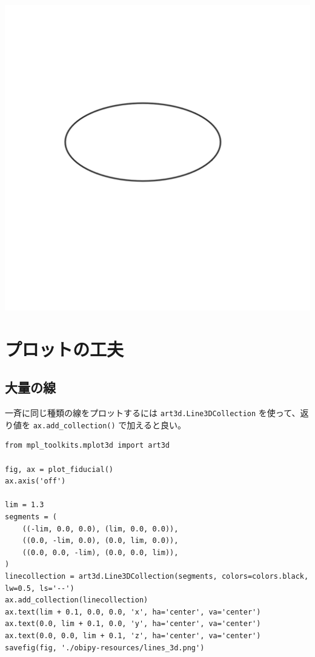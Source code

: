 \documentclass[a4paper, 10pt, notitlepage, twocolumn, uplatex, oneside, dvipdfmx]{jsarticle}
\begin{document}
\label{}
\begin{center}
\includegraphics[width=1.0\linewidth]{./obipy-resources/noaxis_3d.png}
\end{center}
\section{プロットの工夫}
\label{sec:org20c7485}
\subsection{大量の線}
\label{sec:orga1d43cb}
一斉に同じ種類の線をプロットするには \texttt{art3d.Line3DCollection} を使って、返り値を \texttt{ax.add\_collection()} で加えると良い。
\begin{verbatim}
from mpl_toolkits.mplot3d import art3d

fig, ax = plot_fiducial()
ax.axis('off')

lim = 1.3
segments = (
    ((-lim, 0.0, 0.0), (lim, 0.0, 0.0)),
    ((0.0, -lim, 0.0), (0.0, lim, 0.0)),
    ((0.0, 0.0, -lim), (0.0, 0.0, lim)),
)
linecollection = art3d.Line3DCollection(segments, colors=colors.black, lw=0.5, ls='--')
ax.add_collection(linecollection)
ax.text(lim + 0.1, 0.0, 0.0, 'x', ha='center', va='center')
ax.text(0.0, lim + 0.1, 0.0, 'y', ha='center', va='center')
ax.text(0.0, 0.0, lim + 0.1, 'z', ha='center', va='center')
savefig(fig, './obipy-resources/lines_3d.png')
\end{verbatim}
\end{document}
